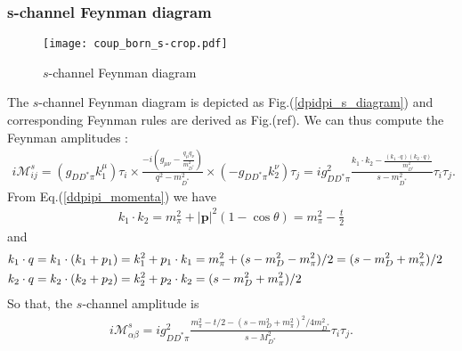 \documentclass[aps,prd,preprintnumbers,showpacs,showkeys,nofootinbib,
superscriptaddress,fleqn,floatfix,tightenlines, 10pt]{revtex4-1}
\begin{document}
\subsubsection{s-channel Feynman diagram}
\begin{figure}[H] \label{dpidpi_s_diagram}
	\centering
	\texttt{[image: coup\_born\_s-crop.pdf]}
	\caption{$s$-channel Feynman diagram}
	\label{fig1}
\end{figure}
The $s$-channel Feynman diagram is depicted as Fig.(\ref{dpidpi_s_diagram}) and
corresponding Feynman rules are derived as Fig.(ref). We can thus compute the Feynman amplitudes :
\begin{align}
	i \mathcal{M}_{ij}^s = (g_{DD^* \pi} k_1^\mu) \tau_i \times
	\frac{-i \left(g_{\mu\nu} - \frac{q_\mu q_\nu}{m_{D^*}^2}\right)}{q^2-m_{D^*}^2} \times (-g_{DD^* \pi} k_2^\nu) \tau_j
	= i g_{DD^* \pi}^2 \frac{k_1 \cdot k_2 - \frac{(k_1 \cdot q)(k_2 \cdot q)}{m_{D^*}^2}}{s-m_{D^*}^2} \tau_i \tau_j .
\end{align}
From Eq.(\ref{ddpipi_momenta}) we have
\begin{align}
	k_1 \cdot k_2 = m_\pi^2 + |\bm{p}|^2 (1-\cos{\theta}) = m_\pi^2 - \frac{t}{2}
\end{align}
and
\begin{align}
	k_1 \cdot q &= k_1 \cdot (k_1 + p_1) = k_1^2 + p_1 \cdot k_1 = m_\pi^2 + (s - m_D^2 - m_\pi^2)/2 = (s - m_D^2 + m_\pi^2)/2 \cr
	k_2 \cdot q &= k_2 \cdot (k_2 + p_2) = k_2^2 + p_2 \cdot k_2 = (s - m_D^2 + m_\pi^2)/2
\end{align}
So that, the $s$-channel amplitude is
\begin{align}\label{ddpipi_s}
	i \mathcal{M}_{\alpha\beta}^s = i g_{DD^* \pi}^2
	\frac{m_\pi^2 - t/2 - (s - m_D^2 + m_\pi^2)^2/4 m_{D^*}^2}{s - M_{D^*}^2} \tau_i \tau_j.
\end{align}

\end{document}
